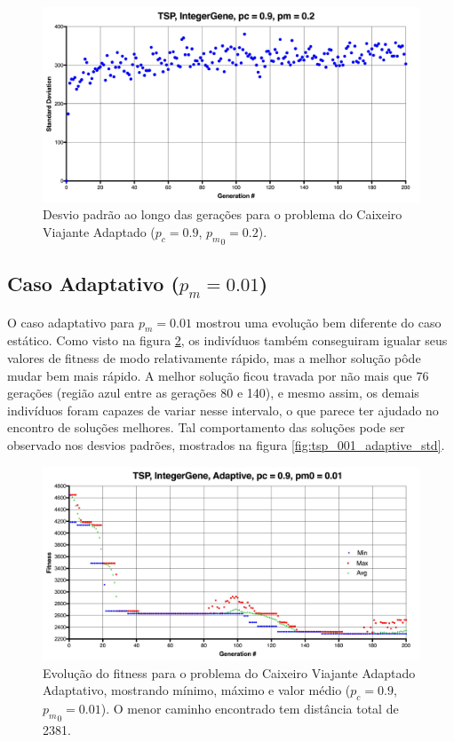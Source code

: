 \begin{figure}[ht!]
    \centering \includegraphics[width=1.0\textwidth]{tsp_02_std.jpg}
    \caption{Desvio padrão ao longo das gerações para o problema do Caixeiro Viajante Adaptado ($p_c=0.9$, ${p_m}_0=0.2$).}
    \label{fig:tsp02std}
\end{figure}

\subsection{Caso Adaptativo ($p_m = 0.01$)}

O caso adaptativo para $p_m = 0.01$ mostrou uma evolução bem diferente do caso estático. Como visto na figura \ref{fig:tsp_001_adaptative}, os indivíduos também conseguiram igualar seus valores de fitness de modo relativamente rápido, mas a melhor solução pôde mudar bem mais rápido. A melhor solução ficou travada por não mais que 76 gerações (região azul entre as gerações 80 e 140), e mesmo assim, os demais indivíduos foram capazes de variar nesse intervalo, o que parece ter ajudado no encontro de soluções melhores. Tal comportamento das soluções pode ser observado nos desvios padrões, mostrados na figura \ref{fig:tsp_001_adaptive_std}.

\begin{figure}[ht!]
    \centering \includegraphics[width=1.0\textwidth]{tsp_001_adaptive.jpg}
    \caption{Evolução do fitness para o problema do Caixeiro Viajante Adaptado Adaptativo, mostrando mínimo, máximo e valor médio ($p_c=0.9$, ${p_m}_0=0.01$). O menor caminho encontrado tem distância total de 2381.}
    \label{fig:tsp_001_adaptative}
\end{figure}

